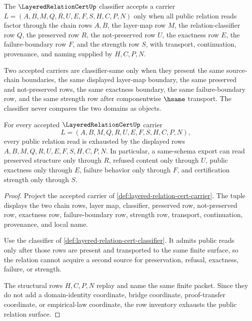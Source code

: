 \begin{definition}
\label{def:layered-relation-cert-classifier}
The $\LayeredRelationCertUp$ classifier accepts a carrier $L=(A,B,M,Q,R,U,E,F,S,H,C,P,N)$ only when all public relation reads factor through the chain rows $A,B$, the layer-map row $M$, the relation-classifier row $Q$, the preserved row $R$, the not-preserved row $U$, the exactness row $E$, the failure-boundary row $F$, and the strength row $S$, with transport, continuation, provenance, and naming supplied by $H,C,P,N$.

Two accepted carriers are classifier-same only when they present the same source-chain boundaries, the same displayed layer-map boundary, the same preserved and not-preserved rows, the same exactness boundary, the same failure-boundary row, and the same strength row after componentwise $\hsame$ transport. The classifier never compares the two domains as objects.
\end{definition}

\begin{theorem}
\label{thm:layered-relation-cert-field-exhaustion}
For every accepted $\LayeredRelationCertUp$ carrier
$$
L=(A,B,M,Q,R,U,E,F,S,H,C,P,N),
$$
every public relation read is exhausted by the displayed rows $A,B,M,Q,R,U,E,F,S,H,C,P,N$. In particular, a same-schema export can read preserved structure only through $R$, refused content only through $U$, public exactness only through $E$, failure behavior only through $F$, and certification strength only through $S$.
\end{theorem}
\begin{proof}
Project the accepted carrier of \autoref{def:layered-relation-cert-carrier}. The tuple displays the two chain rows, layer map, classifier, preserved row, not-preserved row, exactness row, failure-boundary row, strength row, transport, continuation, provenance, and local name.

Use the classifier of \autoref{def:layered-relation-cert-classifier}. It admits public reads only after those rows are present and transported to the same finite surface, so the relation cannot acquire a second source for preservation, refusal, exactness, failure, or strength.

The structural rows $H,C,P,N$ replay and name the same finite packet. Since they do not add a domain-identity coordinate, bridge coordinate, proof-transfer coordinate, or empirical-law coordinate, the row inventory exhausts the public relation surface.
\end{proof}


